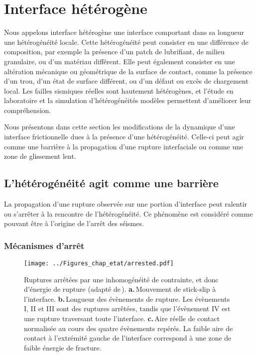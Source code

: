 \section{Interface hétérogène}
\label{sec:hetero}


Nous appelons interface hétérogène une interface comportant dans sa longueur une hétérogénéité locale. Cette hétérogénéité peut consister en une différence de composition, par exemple la présence d'un patch de lubrifiant, de milieu granulaire, ou d'un matériau différent. Elle peut également consister en une altération mécanique ou géométrique de la surface de contact, comme la présence d'un trou, d'un état de surface différent, ou d'un défaut ou excès de chargement local. Les failles sismiques réelles sont hautement hétérogènes, et l'étude en laboratoire et la simulation d'hétérogénéités modèles permettent d'améliorer leur compréhension.

Nous présentons dans cette section les modifications de la dynamique d'une interface frictionnelle dues à la présence d'une hétérogénéité. Celle-ci peut agir comme une barrière à la propagation d'une rupture interfaciale ou comme une zone de glissement lent.





\subsection{L'hétérogénéité agit comme une barrière}
La propagation d'une rupture observée sur une portion d'interface peut ralentir ou s'arrêter à la rencontre de l'hétérogénéité. Ce phénomène est considéré comme pouvant être à l'origine de l'arrêt des séismes.

\subsubsection{Mécanismes d'arrêt}

\begin{figure}[htb]
\centering
\texttt{[image: ../Figures\_chap\_etat/arrested.pdf]}
\caption[Ruptures arrêtées]{Ruptures arrêtées par une inhomogénéité de contrainte, et donc d'énergie de rupture (adapté de\,\cite{rubinstein_dynamics_2007}). \textbf{a.}\,Mouvement de stick-slip à l'interface. \textbf{b.}\,Longueur des évènements de rupture. Les évènements I, II et III sont des ruptures arrêtées, tandis que l'évènement IV est une rupture traversant toute l'interface. \textbf{c.}\,Aire réelle de contact normalisée au cours des quatre évènements repérés. La faible aire de contact à l'extrémité gauche de l'interface correspond à une zone de faible énergie de fracture.}
\label{fig:moche}
\end{figure}





